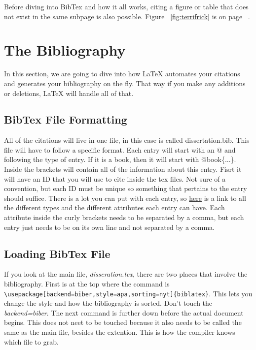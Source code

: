 \documentclass[./dissertation.tex]{subfiles}
\begin{document}
    
    Before diving into BibTex and how it all works, citing a figure or table that does not exist in the same subpage is also possible. Figure ~\ref{fig:terrifrick} is on page ~\pageref{fig:terrifrick}.
    
    \section{The Bibliography}
      In this section, we are going to dive into how LaTeX automates your citations and generates your bibliography on the fly. That way if you make any additions or deletions, LaTeX will handle all of that.
      \subsection{BibTex File Formatting}
        All of the citations will live in one file, in this case is called dissertation.bib. This file will have to follow a specific format. Each entry will start with an @ and following the type of entry. If it is a book, then it will start with @book\{...\}. Inside the brackets will contain all of the information about this entry. Fisrt it will have an ID that you will use to cite inside the tex files. Not sure of a convention, but each ID must be unique so something that pertains to the entry should suffice. There is a lot you can put with each entry, so \href{https://www2.cs.arizona.edu/~collberg/Teaching/07.231/BibTeX/bibtex.html}{here} is a link to all the different types and the different attributes each entry can have. Each attribute inside the curly brackets needs to be separated by a comma, but each entry just needs to be on its own line and not separated by a comma.
      \subsection{Loading BibTex File}
        If you look at the main file, \textit{disseration.tex}, there are two places that involve the bibliography. First is at the top where the command is \verb+\usepackage[backend=biber,style=apa,sorting=nyt]{biblatex}+. This lets you change the style and how the bibliography is sorted. Don't touch the \textit{backend=biber}. The next command is \verb++ further down before the actual document begins. This does not neet to be touched because it also needs to be called the same as the main file, besides the extention. This is how the compiler knows which file to grab.
\end{document}
